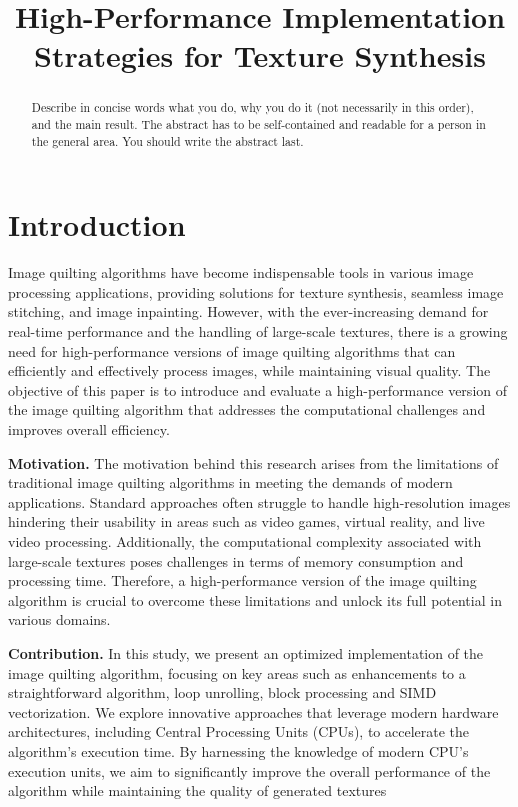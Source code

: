 \documentclass[letterpaper]{article}
\title{High-Performance Implementation Strategies for Texture Synthesis}
\newcommand{\mypar}[1]{{\bf #1.}}
\begin{document}
\pagestyle{plain}

%
\maketitle
%

\begin{abstract}
Describe in concise words what you do, why you do it (not necessarily
in this order), and the main result. The abstract has to be
self-contained and readable for a person in the general area. You
should write the abstract last.
\end{abstract}

\section{Introduction}\label{sec:intro}

Image quilting algorithms have become indispensable tools in various image processing applications, providing solutions for texture synthesis, seamless image stitching, and image inpainting. However, with the ever-increasing demand for real-time performance and the handling of large-scale textures, there is a growing need for high-performance versions of image quilting algorithms that can efficiently and effectively process images, while maintaining visual quality. The objective of this paper is to introduce and evaluate a high-performance version of the image quilting algorithm that addresses the computational challenges and improves overall efficiency. 

\mypar{Motivation} The motivation behind this research arises from the limitations of traditional image quilting algorithms in meeting the demands of modern applications. Standard approaches often struggle to handle high-resolution images hindering their usability in areas such as video games, virtual reality, and live video processing. Additionally, the computational complexity associated with large-scale textures poses challenges in terms of memory consumption and processing time. Therefore, a high-performance version of the image quilting algorithm is crucial to overcome these limitations and unlock its full potential in various domains.

\mypar{Contribution}
In this study, we present an optimized implementation of the image quilting algorithm, focusing on key areas such as enhancements to a straightforward algorithm, loop unrolling, block processing and SIMD vectorization. We explore innovative approaches that leverage modern hardware architectures, including Central Processing Units (CPUs), to accelerate the algorithm's execution time. By harnessing the knowledge of modern CPU's execution units, we aim to significantly improve the overall performance of the algorithm while maintaining the quality of generated textures
\end{document}
